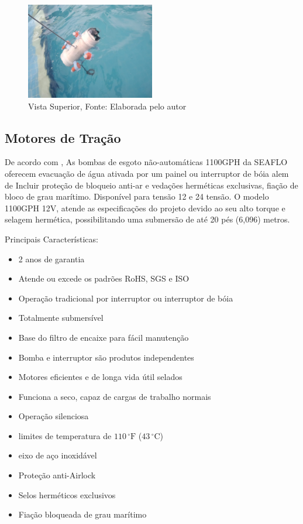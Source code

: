 \begin{figure}[!htb]
	\centering	
	\includegraphics[width=0.5\textwidth]{Figures/Rov/Estrutura_ROV.jpeg}
	\caption{Vista Superior, Fonte: Elaborada pelo autor\the\year}
	\label{fig:estruturarov}
\end{figure}

\subsection{Motores de Tração}
\label{sec:motoresdetracao}

De acordo com \cite{bombadeporao}, As bombas de esgoto não-automáticas 1100GPH da SEAFLO oferecem evacuação de água ativada por um painel ou interruptor de bóia alem de Incluir proteção de bloqueio anti-ar e vedações herméticas exclusivas, fiação de bloco de grau marítimo. Disponível para tensão 12 e 24 tensão. O modelo 1100GPH 12V, atende as especificações do projeto devido ao seu alto torque e selagem hermética, possibilitando uma submersão de até 20 pés (6,096) metros.

Principais Características:

\begin{itemize}
    \item 2 anos de garantia
    \item Atende ou excede os padrões RoHS, SGS e ISO
    \item Operação tradicional por interruptor ou interruptor de bóia
    \item Totalmente submersível
    \item Base do filtro de encaixe para fácil manutenção
    \item Bomba e interruptor são produtos independentes
    \item Motores eficientes e de longa vida útil selados
    \item Funciona a seco, capaz de cargas de trabalho normais
    \item Operação silenciosa
    \item limites de temperatura de $110\,^{\circ}\mathrm{F}$ ($43\,^{\circ}\mathrm{C}$)
    \item eixo de aço inoxidável
    \item Proteção anti-Airlock
    \item Selos herméticos exclusivos
    \item Fiação bloqueada de grau marítimo
\end{itemize}

